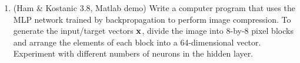 \documentclass[10pt]{article}
\newcommand{\vect}[1]{{\bf{#1}}}
\begin{document}
\begin{enumerate}
\vspace{2mm}

\item (Ham \& Kostanic 3.8, Matlab demo) Write a computer program that uses the MLP
  network trained by backpropagation to perform image compression. To
  generate the input/target vectors $\vect{x}$, divide the image into
  8-by-8 pixel blocks and arrange the elements of each block into a
  64-dimensional vector. Experiment with different numbers of neurons
  in the hidden layer.

\end{enumerate}
\end{document}
